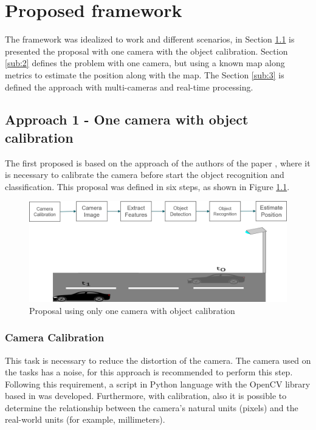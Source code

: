 
\chapter{Proposed framework}
\label{capitulo4}
The framework was idealized to work and different scenarios, in Section \ref{sub:1} is presented the proposal with one camera with the object calibration. Section \ref{sub:2} defines the problem with one camera, but using a known map along metrics to estimate the position along with the map. The Section \ref{sub:3} is defined the approach with multi-cameras and real-time processing. 



\section{Approach 1 - One camera with object calibration}\label{sub:1}

The first proposed is based on the approach of the authors of the paper \cite{8678911}, where it is necessary to calibrate the camera before start the object recognition and classification. This proposal was defined in six steps, as shown in Figure \ref{fig:proposal1}.

\begin{figure}[H]
\centering
\includegraphics[width=\textwidth]{imagens/proposal1.png}
\caption{Proposal using only one camera with object calibration}
\label{fig:proposal1}
\end{figure}

\subsection{Camera Calibration}

This task is necessary to reduce the distortion of the camera. The camera used on the tasks has a noise, for this approach is recommended to perform this step. Following this requirement, a script in Python language with the OpenCV library based in \cite{zhu2020camera} was developed. Furthermore, with calibration, also it is possible to determine the relationship between the camera's natural units (pixels) and the real-world units (for example, millimeters).

